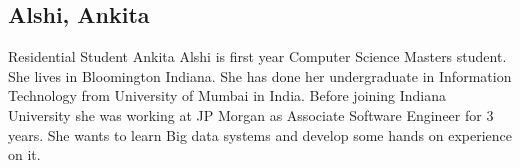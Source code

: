 \subsection{Alshi, Ankita}

Residential Student
Ankita Alshi is first year Computer Science Masters student. She lives in
Bloomington Indiana. She has done her undergraduate in Information Technology 
from University of Mumbai in India. Before joining Indiana University she was
working at JP Morgan as Associate Software Engineer for 3 years. She wants to
learn Big data systems and develop some hands on experience on it.